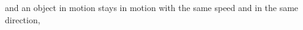 \documentclass[preview]{standalone}
\begin{document}
and an object in motion stays in motion with the same speed and in the same direction,\\
\end{document}
